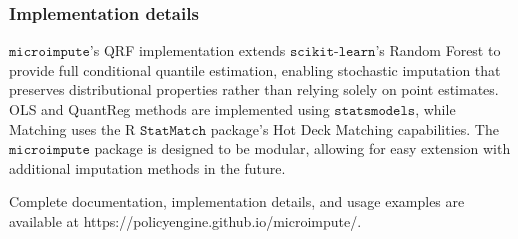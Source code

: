 \subsubsection{Implementation details}

$\texttt{microimpute}$'s QRF implementation extends $\texttt{scikit-learn}$'s Random Forest to provide full conditional quantile estimation, enabling stochastic imputation that preserves distributional properties rather than relying solely on point estimates. OLS and QuantReg methods are implemented using $\texttt{statsmodels}$, while Matching uses the R $\texttt{StatMatch}$ package's Hot Deck Matching capabilities. The $\texttt{microimpute}$ package is designed to be modular, allowing for easy extension with additional imputation methods in the future.

Complete documentation, implementation details, and usage examples are available at https://policyengine.github.io/microimpute/.